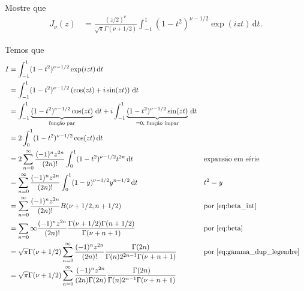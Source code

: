 \documentclass[a4paper,12pt, leqno, answers]{exam}
\begin{document}
\begin{questions}

    \question[T5 de 2011] Mostre que
    \begin{align*}
        J_\nu(z) &= \frac{(z/2)^\nu}{\sqrt{\pi} \Gamma(\nu + 1/2)} \int_{-1}^1 (1 - t^2)^{\nu - 1/2} \exp(i z t) \, \mathrm{d}t.
    \end{align*}
    \begin{solution}
        Temos que
        \begin{align*}
            I &= \int_{-1}^1 (1 - t^2)^{\nu - 1/2} \exp(i z t) \,\mathrm{d}t \\
            &= \int_{-1}^1 (1 - t^2)^{\nu - 1/2} \left( \cos(zt) + i \sin(zt) \right) \,\mathrm{d}t \\
            &= \int_{-1}^1 \underbrace{(1 - t^2)^{\nu - 1/2} \cos(zt)}_{\text{fun\c{c}\~{a}o par}} \,\mathrm{d}t + i \int_{-1}^1 \underbrace{(1 - t^2)^{\nu - 1/2} \sin(zt)}_{= 0 \text{, fun\c{c}\~{a}o \'{i}mpar}} \,\mathrm{d}t \\
            &= 2 \int_0^1 (1 - t^2)^{\nu - 1/2} \cos(zt) \,\mathrm{d}t \\
            &= 2 \sum_{n = 0}^\infty \frac{(-1)^n z^{2n}}{(2n)!} \int_0^1 (1 - t^2)^{\nu - 1/2} t^{2n} \,\mathrm{d}t && \text{expans\~{a}o em s\'{e}rie} \\
            &= \sum_{n = 0}^\infty \frac{(-1)^n z^{2n}}{(2n)!} \int_0^1 (1-y)^{\nu - 1/2} y^{n - 1/2} \,\mathrm{d}t && t^2 = y \\
            &= \sum_{n = 0}^\infty \frac{(-1)^n z^{2n}}{(2n)!} B(\nu + 1/2, n + 1/2) && \text{por \eqref{eq:beta_int}} \\
            &= \sum_{n = 0}\infty \frac{(-1)^n z^{2n}}{(2n)!} \frac{\Gamma(\nu + 1/2) \Gamma(n + 1/2)}{\Gamma(\nu + n + 1)} && \text{por \eqref{eq:beta}} \\
            &= \sqrt{\pi} \Gamma(\nu + 1/2) \sum_{n = 0}^\infty \frac{(-1)^n z^{2n}}{(2n)!} \frac{\Gamma(2n)}{\Gamma(n) 2^{2n - 1} \Gamma(\nu + n + 1)} && \text{por \eqref{eq:gamma_dup_legendre}} \\
            &= \sqrt{\pi} \Gamma(\nu + 1/2) \sum_{n = 0}^\infty \frac{(-1)^n z^{2n}}{(2n) \Gamma(2n)} \frac{\Gamma(2n)}{\Gamma(n) 2^{n - 1} \Gamma(\nu + n + 1)} \\

\end{align*}
\end{solution}
\end{questions}
\end{document}
